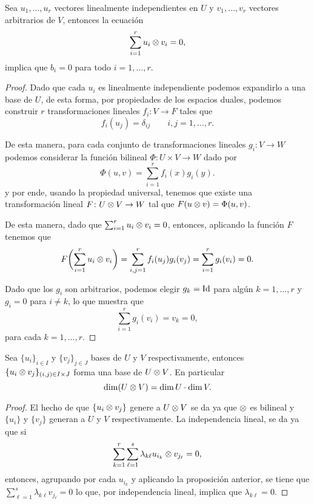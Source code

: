\begin{lemma}
  Sea $u_1,\ldots,u_r$ vectores linealmente independientes en $U$ y $v_1, \ldots,v_r$ vectores arbitrarios de $V$, entonces la ecuación
    \[
      \sum_{i=1}^r u_i \otimes v_i = 0,
    \]
  implica que $b_i = 0$ para todo $i=1,\ldots,r$.
\end{lemma}
\begin{proof}
  Dado que cada $u_i$ es linealmente independiente podemos expandirlo a una base de $U$, de esta forma, por propiedades de los espacios duales, podemos construir $r$ transformaciones lineales $f_i\colon V \to F$ tales que
    \[
      f_i(u_j) = \delta_{ij} \qquad i,j=1,\ldots,r.
    \]
  
    De esta manera, para cada conjunto de transformaciones lineales $g_i\colon V \to W$ podemos considerar la función bilineal $\Phi\colon U \times V \to W$ dado por
    \[
      \Phi(u,v) = \sum_{i=1}^r f_i(x) g_i(y).
    \]
    y por ende, usando la propiedad universal, tenemos que existe una transformación lineal $F\colon U \otimes V \to W$ tal que $F(u \otimes v) = \Phi(u,v)$.

    De esta manera, dado que $\sum_{i=1}^r u_i \otimes v_i = 0$, entonces, aplicando la función $F$ tenemos que
    \[
      F\biggl(\sum_{i=1}^r u_i \otimes v_i \biggr) = \sum_{i,j=1}^r f_i(u_j)g_i(v_j) = \sum_{i=1}^r g_i(v_i) = 0.
    \]

    Dado que los $g_i$ son arbitrarios, podemos elegir $g_k = \mathrm{Id}$ para algún $k=1,\ldots,r$ y $g_i = 0$ para $i \neq k$, lo que muestra que
    \[
      \sum_{i=1}^r g_i(v_i) = v_k = 0,
    \]
    para cada $k=1,\ldots,r$.
\end{proof}

\begin{corollary}
  Sea $\{u_i\}_{i\in I}$ y $\{v_j\}_{j\in J}$ bases de $U$ y $V$ respectivamente, entonces $\{u_i \otimes v_j\}_{(i,j)\in I \times J}$ forma una base de $U \otimes V$. En particular 
  \[
    \dim(U\otimes V) = \dim U \cdot \dim V.
  \]
\end{corollary}
\begin{proof}
  El hecho de que $\{u_i \otimes v_j\}$ genere a $U \otimes V$ se da ya que $\otimes$ es bilineal y $\{u_i\}$ y $\{v_j\}$ generan a $U$ y $V$ respectivamente. La independencia lineal, se da ya que si
  \[
    \sum_{k=1}^r\sum_{\ell=1}^s \lambda_{k\ell} u_{i_k} \otimes v_{j_\ell} = 0,
  \]
  entonces, agrupando por cada $u_{i_k}$ y aplicando la proposición anterior, se tiene que $\sum_{\ell=1}^s \lambda_{k\ell} v_{j_\ell}=0$ lo que, por independencia lineal, implica que $\lambda_{k\ell}=0$.
\end{proof}

